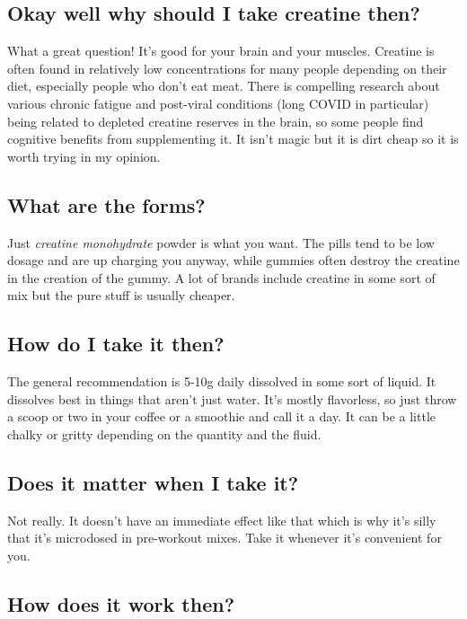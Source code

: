 \documentclass{article}
\begin{document}
{{\subsection{Okay well why should I take creatine then?}

What a great question! It’s good for your brain and your muscles. Creatine is often found in relatively low concentrations for many people depending on their diet, especially people who don’t eat meat. There is compelling research about various chronic fatigue and post-viral conditions (long COVID in particular) being related to depleted creatine reserves in the brain, so some people find cognitive benefits from supplementing it. It isn’t magic but it is dirt cheap so it is worth trying in my opinion.

\subsection{What are the forms?}

Just \textit{creatine monohydrate} powder is what you want. The pills tend to be low dosage and are up charging you anyway, while gummies often destroy the creatine in the creation of the gummy. A lot of brands include creatine in some sort of mix but the pure stuff is usually cheaper.

\subsection{How do I take it then?}

The general recommendation is 5-10g daily dissolved in some sort of liquid. It dissolves best in things that aren’t just water. It’s mostly flavorless, so just throw a scoop or two in your coffee or a smoothie and call it a day. It can be a little chalky or gritty depending on the quantity and the fluid.

\subsection{Does it matter when I take it?}

Not really. It doesn’t have an immediate effect like that which is why it’s silly that it’s microdosed in pre-workout mixes. Take it whenever it’s convenient for you.

\subsection{How does it work then?}

}}
\end{document}
